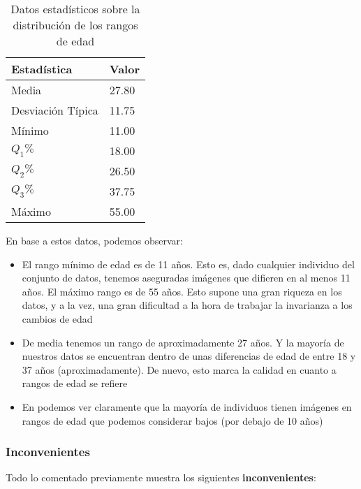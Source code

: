 \begin{table}[h!]
\centering
\begin{tabular}{|l|l|}
    \hline
    \textbf{Estadística} & \textbf{Valor} \\
    \hline

    Media             & 27.80 \\
    Desviación Típica & 11.75 \\
    Mínimo            & 11.00 \\
    $Q_1 \%$          & 18.00 \\
    $Q_2 \%$          & 26.50 \\
    $Q_3 \%$          & 37.75 \\
    Máximo            & 55.00 \\

    \hline

\end{tabular}
\caption{Datos estadísticos sobre la distribución de los rangos de edad}
\label{table:fgnet_rangos_estadisticas}
\end{table}

En base a estos datos, podemos observar:

\begin{itemize}
    \item El rango mínimo de edad es de 11 años. Esto es, dado cualquier individuo del conjunto de datos, tenemos aseguradas imágenes que difieren en al menos 11 años. El máximo rango es de 55 años. Esto supone una gran riqueza en los datos, y a la vez, una gran dificultad a la hora de trabajar la invarianza a los cambios de edad
    \item De media tenemos un rango de aproximadamente 27 años. Y la mayoría de nuestros datos se encuentran dentro de unas diferencias de edad de entre 18 y 37 años (aproximadamente). De nuevo, esto marca la calidad en cuanto a rangos de edad se refiere
    \item En  podemos ver claramente que la mayoría de individuos tienen imágenes en rangos de edad que podemos considerar bajos (por debajo de 10 años)
\end{itemize}

\subsubsection{Inconvenientes} \label{isubsubs:fgnet_inconvenientes}

Todo lo comentado previamente muestra los siguientes \textbf{inconvenientes}:


